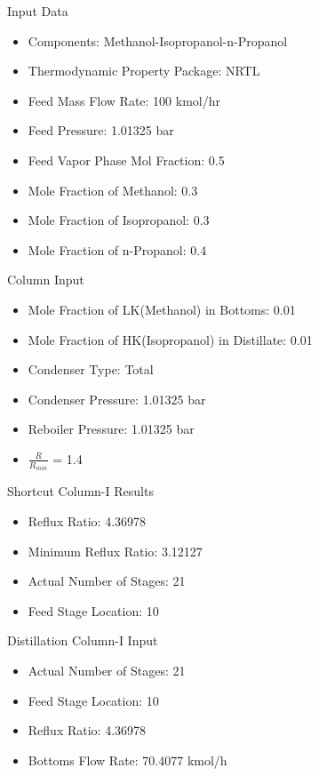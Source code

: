 \documentclass[10pt]{beamer}
\begin{document}
\begin{frame}{Input Data}
	\begin{itemize}
		\item Components: Methanol-Isopropanol-n-Propanol
		\item Thermodynamic Property Package: NRTL
		\item Feed Mass Flow Rate: 100 kmol/hr
		\item Feed Pressure: 1.01325 bar
		\item Feed Vapor Phase Mol Fraction: 0.5
		\item Mole Fraction of Methanol: 0.3
		\item Mole Fraction of Isopropanol: 0.3
		\item Mole Fraction of n-Propanol: 0.4
	\end{itemize}
\end{frame}

\begin{frame}{Column Input}
	\begin{itemize}
		\item Mole Fraction of LK(Methanol) in Bottoms: 0.01
		\item Mole Fraction of HK(Isopropanol) in Distillate: 0.01
		\item Condenser Type: Total
		\item Condenser Pressure: 1.01325 bar
		\item Reboiler Pressure: 1.01325 bar
		\item $\frac{R}{R_{min}}$ = 1.4
	\end{itemize}
\end{frame}

\begin{frame}{Shortcut Column-I Results}
	\begin{itemize}
		\item Reflux Ratio: 4.36978
		\item Minimum Reflux Ratio: 3.12127
		\item Actual Number of Stages: 21
		\item Feed Stage Location: 10
	\end{itemize}
\end{frame}


\begin{frame}{Distillation Column-I Input}
	\begin{itemize}
		\item Actual Number of Stages: 21
		\item Feed Stage Location: 10
		\item Reflux Ratio: 4.36978
		\item Bottoms Flow Rate: 70.4077 kmol/h
	\end{itemize}
\end{frame}
\end{document}
